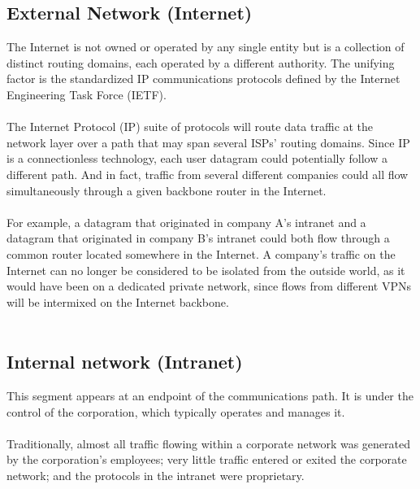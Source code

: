 \documentclass[10pt,a4paper]{article}
\begin{document}
\subsection{External Network (Internet)}
The Internet is not owned or operated by any
single entity but is a collection of distinct routing domains, each operated by a
different authority. The unifying factor is the standardized IP communications
protocols defined by the Internet Engineering Task Force (IETF).
\\
\\
The Internet
Protocol (IP) suite of protocols will route data traffic at the network layer over a
path that may span several ISPs' routing domains. Since IP is a connectionless technology, each user datagram could potentially follow a
different path. And in fact, traffic from several different companies could all
flow simultaneously through a given backbone router in the Internet. 
\\
\\
For
example, a datagram that originated in company A's intranet and a datagram
that originated in company B's intranet could both flow through a common
router located somewhere in the Internet. A company's traffic on the Internet
can no longer be considered to be isolated from the outside world, as it would
have been on a dedicated private network, since flows from different VPNs will
be intermixed on the Internet backbone.
\\
\\
\subsection{Internal network (Intranet)}
This segment appears at an endpoint of the
communications path. It is under the control of the corporation, which typically
operates and manages it. 
\\
\\
Traditionally, almost all traffic flowing within a
corporate network was generated by the corporation's employees; very little
traffic entered or exited the corporate network; and the protocols in the
intranet were proprietary.
\end{document}
